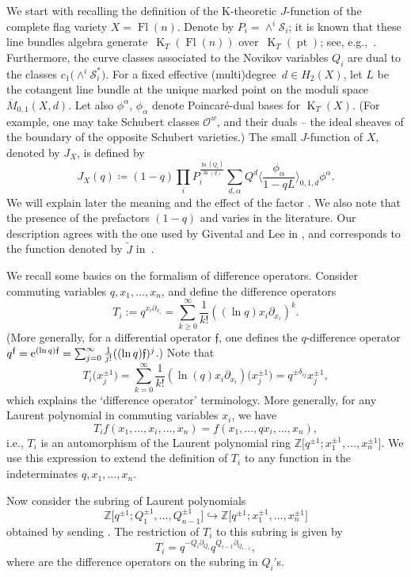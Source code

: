 \documentclass[pdftex]{sigma}
\numberwithin{equation}{section}
\theoremstyle{definition}
\DeclareMathOperator{\Fl}{Fl}
\DeclareMathOperator{\K}{K}
\DeclareMathOperator{\pt}{pt}
\newcommand{\Z}{{\mathbb Z}}
\newcommand{\cO}{{\mathcal O}}
\newcommand{\cS}{{\mathcal S}}
\begin{document}
We start with recalling the definition
of the K-theoretic $J$-function of the complete flag variety $X=\Fl(n)$.
Denote by $P_i= \wedge^i \cS_i$; it is known that these line bundles algebra generate~$\K_T(\Fl(n))$
over~$\K_T(\pt)$; see, e.g.,~\cite[Proposition~3.1]{GMSXZZ:Nakayama}. Furthermore,
the curve classes associated to the Novikov variables
$Q_i$ are dual to the classes
$c_1\bigl(\wedge^i \cS_i^*\bigr)$.
For a fixed effective (multi)degree~${d \in H_2(X)}$, let $L$ be the cotangent line bundle at the unique marked point on the moduli space $\overline{M}_{0,1}(X,d)$.
Let also $\phi^\alpha$, $\phi_\alpha$ denote Poincar\'e-dual bases for $\K_T(X)$. (For example,
one may take Schubert classes $\cO^w$, and their duals -- the ideal sheaves of the boundary of the opposite Schubert varieties.)
The small $J$-function of $X$, denoted by $J_X$, is defined by
\[
J_X(q)\coloneq (1-q)\prod_i P_i^{\frac{\ln(Q_i)}{\ln(q)}}\sum_{d,\alpha} Q^d\biggl\langle \frac{\phi_\alpha}{1-qL}\biggr\rangle_{0,1,d}\phi^\alpha .
\]
We will explain later the meaning and the effect of the factor
. We also note that the presence
of the prefactors $(1-q)$
and  varies in the literature.
Our description agrees with the one used by Givental and Lee in
\cite{givental_lee}, and corresponds to the function denoted by $\tilde{J}$ in~\cite{Iritani:2013qka}.

We recall some basics on the formalism of difference operators. Consider commuting
variables $q, x_1, \dots, x_n$, and define the difference operators
\[
T_i:= q^{x_i \partial_{x_i}} = \sum_{ k \ge 0}^\infty \frac{1}{k!}((\ln q)x_i \partial_{x_i} )^k.
\]
\big(More generally, for a differential operator $\mathfrak{f}$, one defines the $q$-difference operator $q^{\mathfrak{f}}={\rm e}^{(\ln q) \mathfrak{f}}=\sum_{j=0}^\infty \frac{1}{j!}((\ln q)\mathfrak{f})^j$.\big) Note that
\[
T_i \bigl(x_j^{\pm 1}\bigr) = \sum_{k=0}^\infty \frac{1}{k!} ( \ln(q) x_i \partial_{x_i} ) \bigl(x_j^{\pm 1}\bigr) = q^{\pm \delta_{ij}} x_j^{\pm 1} ,
\]
which explains the `difference operator' terminology. More generally, for any Laurent polynomial in commuting variables $x_i$, we have
\[
T_i f(x_1,\dots,x_i,\dots,x_n) = f(x_1,\dots,qx_i,\dots, x_n) ,
\]
i.e., $T_i$ is an automorphism of the Laurent polynomial ring
$\Z\bigl[q^{\pm 1}; x_1^{\pm 1}, \dots, x_{n}^{\pm 1}\bigr]$.
We use this expression to extend the definition of $T_i$ to any function in the indeterminates $q, x_1, \dots, x_n$.

Now consider the subring of Laurent polynomials
\[
\Z\bigl[q^{\pm 1}; Q_1^{\pm 1}, \dots, Q_{n-1}^{\pm 1}\bigr] \hookrightarrow \Z\bigl[q^{\pm 1}; x_1^{\pm 1}, \dots, x_{n}^{\pm 1}\bigr]
\]
obtained by sending . The restriction of $T_i$ to this subring is given by
\begin{equation}\label{E: TiQ}
T_i = q^{-Q_{i}\partial_{Q_{i}}}q^{Q_{i-1}\partial_{Q_{i-1}}} ,
\end{equation}
where  are the difference operators on the subring in $Q_i$'s.
\end{document}
